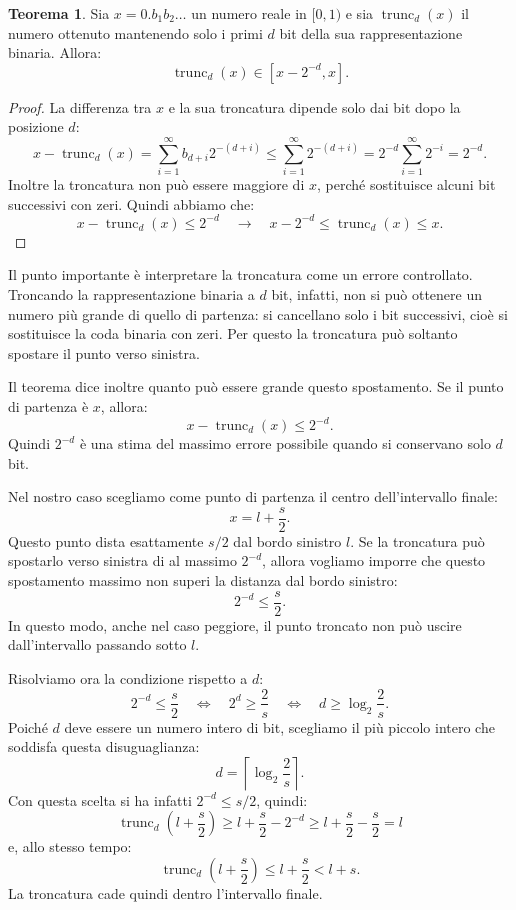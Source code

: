 \documentclass{article}
\theoremstyle{definition}
\newtheorem{theorem}{Teorema}[section] %
\numberwithin{equation}{section}
\begin{document}
\begin{theorem}
    Sia $x=0.b_1b_2\ldots$ un numero reale in $[0,1)$ e sia $\operatorname{trunc}_d(x)$ il numero ottenuto mantenendo solo i primi $d$ bit della sua rappresentazione binaria. Allora:
    \[
        \operatorname{trunc}_d(x)\in[x-2^{-d},x].
    \]
\end{theorem}
\begin{proof}
    La differenza tra $x$ e la sua troncatura dipende solo dai bit dopo la posizione $d$:
    \[
        x-\operatorname{trunc}_d(x)
        =
        \sum_{i=1}^{\infty} b_{d+i}2^{-(d+i)}
        \leq
        \sum_{i=1}^{\infty} 2^{-(d+i)}
        =
        2^{-d} \sum_{i=1}^{\infty} 2^{-i} =
        2^{-d}.
    \]
    Inoltre la troncatura non può essere maggiore di $x$, perché sostituisce alcuni bit successivi con zeri. Quindi abbiamo che:
    \[
        x-\operatorname{trunc}_d(x) \leq 2^{-d} \quad \rightarrow \quad x-2^{-d} \leq \operatorname{trunc}_d(x) \leq x.
    \]
\end{proof}

Il punto importante è interpretare la troncatura come un errore controllato. Troncando la rappresentazione binaria a $d$ bit, infatti, non si può ottenere un numero più grande di quello di partenza: si cancellano solo i bit successivi, cioè si sostituisce la coda binaria con zeri. Per questo la troncatura può soltanto spostare il punto verso sinistra.

Il teorema dice inoltre quanto può essere grande questo spostamento. Se il punto di partenza è $x$, allora:
\[
    x-\operatorname{trunc}_d(x)\leq 2^{-d}.
\]
Quindi $2^{-d}$ è una stima del massimo errore possibile quando si conservano solo $d$ bit.

Nel nostro caso scegliamo come punto di partenza il centro dell'intervallo finale:
\[
    x=l+\frac{s}{2}.
\]
Questo punto dista esattamente $s/2$ dal bordo sinistro $l$. Se la troncatura può spostarlo verso sinistra di al massimo $2^{-d}$, allora vogliamo imporre che questo spostamento massimo non superi la distanza dal bordo sinistro:
\[
    2^{-d}\leq \frac{s}{2}.
\]
In questo modo, anche nel caso peggiore, il punto troncato non può uscire dall'intervallo passando sotto $l$.

Risolviamo ora la condizione rispetto a $d$:
\[
    2^{-d}\leq \frac{s}{2}
    \quad\Longleftrightarrow\quad
    2^d\geq \frac{2}{s}
    \quad\Longleftrightarrow\quad
    d\geq \log_2\frac{2}{s}.
\]
Poiché $d$ deve essere un numero intero di bit, scegliamo il più piccolo intero che soddisfa questa disuguaglianza:
\[
    d=\left\lceil\log_2\frac{2}{s}\right\rceil.
\]
Con questa scelta si ha infatti $2^{-d}\leq s/2$, quindi:
\[
    \operatorname{trunc}_d\left(l+\frac{s}{2}\right)
    \geq
    l+\frac{s}{2}-2^{-d}
    \geq
    l+\frac{s}{2}-\frac{s}{2}
    =
    l
\]
e, allo stesso tempo:
\[
    \operatorname{trunc}_d\left(l+\frac{s}{2}\right)
    \leq
    l+\frac{s}{2}
    <
    l+s.
\]
La troncatura cade quindi dentro l'intervallo finale.
\end{document}
